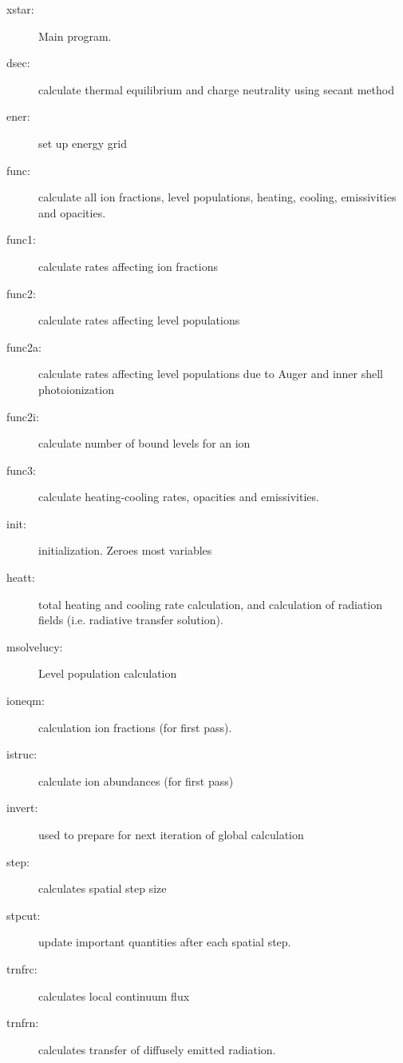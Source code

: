 \begin{description}

\item[xstar:] Main program.

\item[dsec:]calculate thermal equilibrium and charge neutrality using secant 
method

\item[ener:] set up energy grid

\item[func:]calculate all ion fractions, level populations, heating, cooling,
emissivities and opacities.

\item[func1:]calculate rates affecting  ion fractions

\item[func2:]calculate rates affecting level populations

\item[func2a:]calculate rates affecting level populations due to Auger 
and inner shell photoionization

\item[func2i:]calculate number of bound levels for an ion

\item[func3:]calculate heating-cooling rates, opacities and emissivities.

\item[init:]initialization.  Zeroes most variables

\item[heatt:]total heating and cooling rate calculation, and calculation 
of radiation fields (i.e. radiative transfer solution).

\item[msolvelucy:]Level population calculation

\item[ioneqm:]calculation ion fractions (for first pass).

\item[istruc:]calculate ion abundances (for first pass)

\item[invert:] used to prepare for next iteration of global calculation

\item[step:]calculates spatial step size

\item[stpcut:] update important quantities after each spatial step.

\item[trnfrc:]calculates local continuum flux

\item[trnfrn:]calculates transfer of diffusely emitted radiation.

\end{description}

